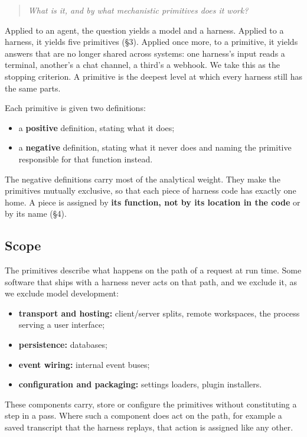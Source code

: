 \begin{quote}
\emph{What is it, and by what mechanistic primitives does it work?}
\end{quote}

Applied to an agent, the question yields a model and a harness. Applied to a harness, it yields five primitives (§3). Applied once more, to a primitive, it yields answers that are no longer shared across systems: one harness's input reads a terminal, another's a chat channel, a third's a webhook. We take this as the stopping criterion. A primitive is the deepest level at which every harness still has the same parts.

Each primitive is given two definitions:

\begin{itemize}
\tightlist
\item
  a \textbf{positive} definition, stating what it does;
\item
  a \textbf{negative} definition, stating what it never does and naming the primitive responsible for that function instead.
\end{itemize}

The negative definitions carry most of the analytical weight. They make the primitives mutually exclusive, so that each piece of harness code has exactly one home. A piece is assigned by \textbf{its function, not by its location in the code} or by its name (§4).

\subsection{Scope}

The primitives describe what happens on the path of a request at run time. Some software that ships with a harness never acts on that path, and we exclude it, as we exclude model development:

\begin{itemize}
\tightlist
\item
  \textbf{transport and hosting:} client/server splits, remote workspaces, the process serving a user interface;
\item
  \textbf{persistence:} databases;
\item
  \textbf{event wiring:} internal event buses;
\item
  \textbf{configuration and packaging:} settings loaders, plugin installers.
\end{itemize}

These components carry, store or configure the primitives without constituting a step in a pass. Where such a component does act on the path, for example a saved transcript that the harness replays, that action is assigned like any other.

